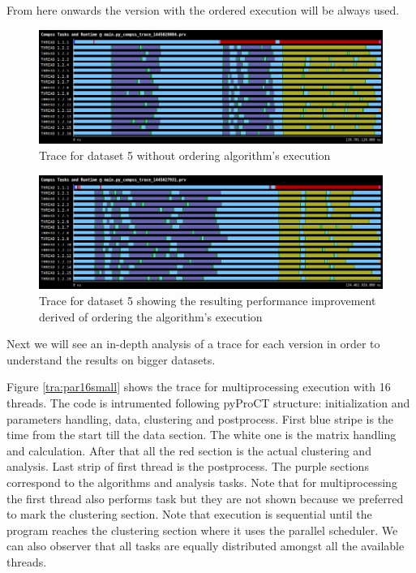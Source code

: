 From here onwards the version with the ordered execution will be always used.


\begin{figure}[h]
\includegraphics[width=\textwidth]{traces/compss_2_small_noorder.png}
\caption{Trace for dataset 5 without ordering algorithm's execution}
\label{fig:small_trace_noorder}
\end{figure}

\begin{figure}[h]
\includegraphics[width=\textwidth]{traces/compss_2_small_order.png}
\caption{Trace for dataset 5 showing the resulting performance improvement derived of ordering the algorithm's execution}
\label{fig:small_trace_order}
\end{figure}

Next we will see an in-depth analysis of a trace for each version in order to understand the results on bigger datasets.

Figure \ref{tra:par16small} shows the trace for multiprocessing execution with 16 threads. The code is intrumented following pyProCT structure: initialization and parameters handling, data, clustering and postprocess. First blue stripe is the time from the start till the data section. The white one is the matrix handling and calculation. After that all the red section is the actual clustering and analysis. Last strip of first thread is the postprocess. The purple sections correspond to the algorithms and analysis tasks. Note that for multiprocessing the first thread also performs task but they are not shown because we preferred to mark the clustering section. Note that execution is sequential until the program reaches the clustering section where it uses the parallel scheduler. We can also observer that all tasks are equally distributed amongst all the available threads. 

